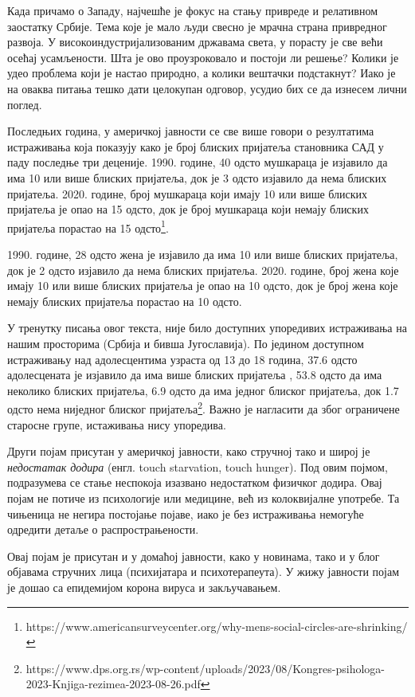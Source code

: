\documentclass[b5paper]{article}
\begin{document}
\large

Када причамо о Западу, најчешће је фокус на стању привреде и релативном заостатку Србије. Тема које је мало људи свесно је мрачна страна привредног развоја. У високоиндустријализованим државама света, у порасту је све већи осећај усамљености. Шта је ово проузроковало и постоји ли решење? Колики је удео проблема који је настао природно, а колики вештачки подстакнут? Иако је на оваква питања тешко дати целокупан одговор, усудио бих се да изнесем лични поглед.

Последњих година, у америчкој јавности се све више говори о резултатима истраживања која показују како је број блиских пријатеља становника САД у паду последње три деценије. 1990. године, 40 одсто мушкараца је изјавило да има 10 или више блиских пријатеља, док је 3 одсто изјавило да нема блиских пријатеља. 2020. године, број мушкараца који имају 10 или више блиских пријатеља је опао на 15 одсто, док је број мушкараца који немају блиских пријатеља порастао на 15 одсто\footnote{https://www.americansurveycenter.org/why-mens-social-circles-are-shrinking/}.

1990. године, 28 одсто жена је изјавило да има 10 или више блиских пријатеља, док је 2 одсто изјавило да нема блиских пријатеља. 2020. године, број жена које имају 10 или више блиских пријатеља је опао на 10 одсто, док је број жена које немају блиских пријатеља порастао на 10 одсто.

У тренутку писања овог текста, није било доступних упоредивих истраживања на нашим просторима (Србија и бивша Југославија). По једином доступном истраживању над адолесцентима узраста од 13 до 18 година, 37.6 одсто адолесцената је изјавило да има више блиских пријатеља , 53.8 одсто да има неколико блиских пријатеља, 6.9 одсто да има једног блиског пријатеља, док 1.7 одсто нема ниједног блиског пријатеља\footnote{https://www.dps.org.rs/wp-content/uploads/2023/08/Kongres-psihologa-2023-Knjiga-rezimea-2023-08-26.pdf}. Важно је нагласити да због ограничене старосне групе, истаживања нису упоредива.

Други појам присутан у америчкој јавности, како стручној тако и широј је \textit{недостатак додира} (енгл. touch starvation, touch hunger). Под овим појмом, подразумева се стање неспокоја изазвано недостатком физичког додира. Овај појам не потиче из психологије или медицине, већ из колоквијалне употребе. Та чињеница не негира постојање појаве, иако је без истраживања немогуће одредити детаље о распрострањености.

Овај појам је присутан и у домаћој јавности, како у новинама, тако и у блог објавама стручних лица (психијатара и психотерапеута). У жижу јавности појам је дошао са епидемијом корона вируса и закључавањем.
\end{document}
